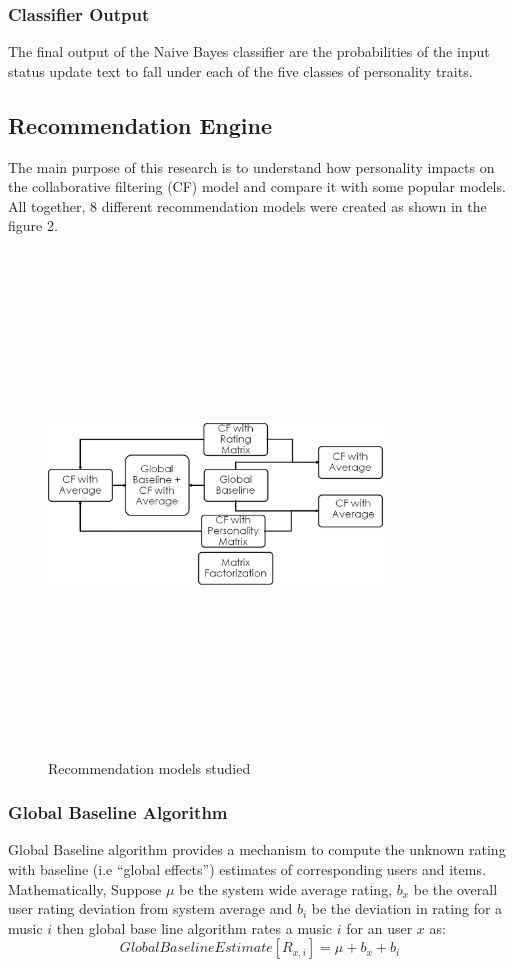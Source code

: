 \documentclass[journal]{IEEEtran}
\begin{document}
\subsubsection{Classifier Output}
The final output of the Naive Bayes classifier are the probabilities of the input status update text to fall under each of the five classes of personality traits.


\subsection{Recommendation Engine}
The main purpose of this research is to understand how personality impacts on the collaborative filtering (CF) model and compare it with some popular models. All together, 8 different recommendation models were created as shown in the figure 2.
\begin{figure}[!h]
\centering
\includegraphics[width=3.5in,height=5.25in,clip,keepaspectratio]{recommendation_models.png}
\caption{Recommendation models studied}
\label{fig:2}
\end{figure}

\subsubsection{Global Baseline Algorithm}
Global Baseline algorithm provides a mechanism to compute the unknown rating with baseline (i.e ``global effects'') estimates of corresponding users and items.
Mathematically,
Suppose $\mu$ be the system wide average rating, $b_x$ be the overall user rating deviation from system average and $b_i$ be the deviation in rating for a music $i$ then global base line algorithm rates a music $i$ for an user $x$ as:
\begin{equation}\label{eq:baseline}
  Global Baseline Estimate[R_{x,i}] = \mu + b_x + b_i
\end{equation}
\end{document}
